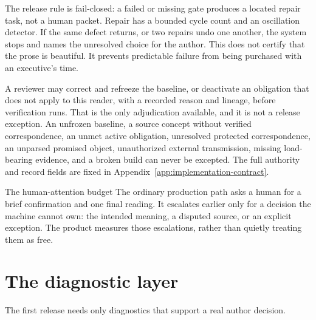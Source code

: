 The release rule is fail-closed: a failed or missing gate produces a located
repair task, not a human packet. Repair has a bounded cycle count and an
oscillation detector. If the same defect returns, or two repairs undo one
another, the system stops and names the unresolved choice for the author. This
does not certify that the prose is beautiful. It prevents predictable failure
from being purchased with an executive's time.

A reviewer may correct and refreeze the baseline, or deactivate an obligation that
does not apply to this reader, with a recorded reason and lineage, before
verification runs. That is the only adjudication available, and it is not a
release exception. An unfrozen baseline, a source concept without verified
correspondence, an unmet active obligation, unresolved protected correspondence,
an unparsed promised object, unauthorized external transmission, missing
load-bearing evidence, and a broken build can never be excepted. The full
authority and record fields are fixed in
Appendix~\ref{app:implementation-contract}.

\begin{takeawaybox}{The human-attention budget}
The ordinary production path asks a human for a brief confirmation and one
final reading. It escalates earlier only for a decision the machine cannot own:
the intended meaning, a disputed source, or an explicit exception. The product
measures those escalations, rather than quietly treating them as free.
\end{takeawaybox}

\section{The diagnostic layer}

The first release needs only diagnostics that support a real author decision.

